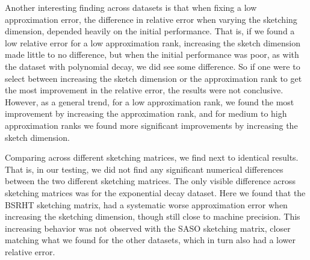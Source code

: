 \documentclass{article}
\theoremstyle{definition}
\begin{document}
Another interesting finding across datasets is that when fixing a low approximation error, the difference in relative error when varying the sketching dimension, depended heavily on the initial performance. That is, if we found a low relative error for a low approximation rank, increasing the sketch dimension made little to no difference, but when the initial performance was poor, as with the dataset with polynomial decay, we did see some difference. So if one were to select between increasing the sketch dimension or the approximation rank to get the most improvement in the relative error, the results were not conclusive. However, as a general trend, for a low approximation rank, we found the most improvement by increasing the approximation rank, and for medium to high approximation ranks we found more significant improvements by increasing the sketch dimension.\newline

Comparing across different sketching matrices, we find next to identical results. That is, in our testing, we did not find any significant numerical differences between the two different sketching matrices. The only visible difference across sketching matrices was for the exponential decay dataset. Here we found that the BSRHT sketching matrix, had a systematic worse approximation error when increasing the sketching dimension, though still close to machine precision. This increasing behavior was not observed with the SASO sketching matrix, closer matching what we found for the other datasets, which in turn also had a lower relative error. 

\end{document}
